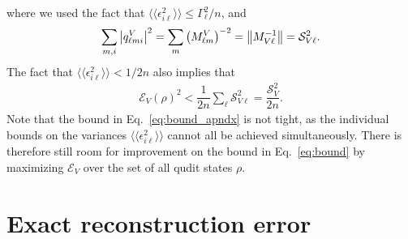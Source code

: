 \documentclass[notitlepage,twocolumn]{revtex4-2}
\newcommand{\f}[2]{\dfrac{#1}{#2}} %
\newcommand{\p}[1]{\left(#1\right)} %
\newcommand{\bbk}[1]{\langle\!\langle #1 \rangle\!\rangle}
\newcommand{\E}{\mathcal{E}}
\renewcommand{\S}{\mathcal{S}}
\begin{document}
where we used the fact that $\bbk{\epsilon_{i\ell}^2}\le\Gamma_\ell^2/n$, and
\begin{align}
  \sum_{m,i} \abs{q^V_{\ell mi}}^2
  = \sum_m \p{M^V_{\ell m}}^{-2}
  = \norm{M_{V\ell}^{-1}}
  = \S_{V\ell}^2.
\end{align}
The fact that $\bbk{\epsilon_{i\ell}^2}<1/2n$ also implies that
\begin{align}
  \E_V\p{\rho}^2 < \f1{2n} \sum_\ell \S_{V\ell}^2 = \f{\S_V^2}{2n}.
\end{align}
Note that the bound in Eq.~\eqref{eq:bound_apndx} is not tight, as the individual bounds on the variances $\bbk{\epsilon_{i\ell}^2}$ cannot all be achieved simultaneously.
There is therefore still room for improvement on the bound in Eq.~\eqref{eq:bound} by maximizing $\E_V$ over the set of all qudit states $\rho$.

\section{Exact reconstruction error}
\label{sec:exact}
\end{document}
